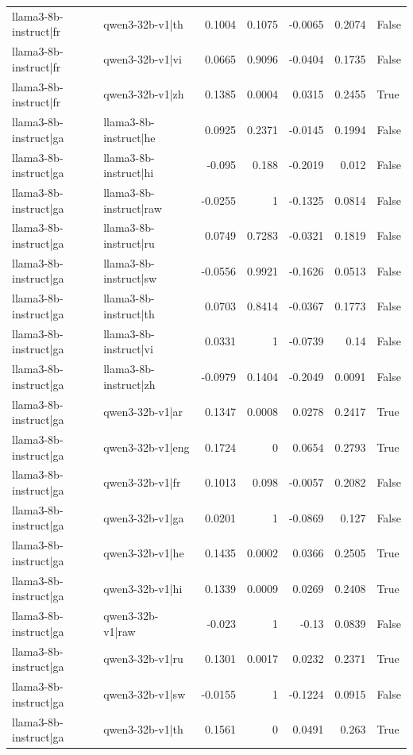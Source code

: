 \begin{table}
\begin{tabular}{l l r r r r l}
llama3-8b-instruct|fr & qwen3-32b-v1|th & 0.1004 & 0.1075 & -0.0065 & 0.2074 & False \\
llama3-8b-instruct|fr & qwen3-32b-v1|vi & 0.0665 & 0.9096 & -0.0404 & 0.1735 & False \\
llama3-8b-instruct|fr & qwen3-32b-v1|zh & 0.1385 & 0.0004 & 0.0315 & 0.2455 & True \\
llama3-8b-instruct|ga & llama3-8b-instruct|he & 0.0925 & 0.2371 & -0.0145 & 0.1994 & False \\
llama3-8b-instruct|ga & llama3-8b-instruct|hi & -0.095 & 0.188 & -0.2019 & 0.012 & False \\
llama3-8b-instruct|ga & llama3-8b-instruct|raw & -0.0255 & 1 & -0.1325 & 0.0814 & False \\
llama3-8b-instruct|ga & llama3-8b-instruct|ru & 0.0749 & 0.7283 & -0.0321 & 0.1819 & False \\
llama3-8b-instruct|ga & llama3-8b-instruct|sw & -0.0556 & 0.9921 & -0.1626 & 0.0513 & False \\
llama3-8b-instruct|ga & llama3-8b-instruct|th & 0.0703 & 0.8414 & -0.0367 & 0.1773 & False \\
llama3-8b-instruct|ga & llama3-8b-instruct|vi & 0.0331 & 1 & -0.0739 & 0.14 & False \\
llama3-8b-instruct|ga & llama3-8b-instruct|zh & -0.0979 & 0.1404 & -0.2049 & 0.0091 & False \\
llama3-8b-instruct|ga & qwen3-32b-v1|ar & 0.1347 & 0.0008 & 0.0278 & 0.2417 & True \\
llama3-8b-instruct|ga & qwen3-32b-v1|eng & 0.1724 & 0 & 0.0654 & 0.2793 & True \\
llama3-8b-instruct|ga & qwen3-32b-v1|fr & 0.1013 & 0.098 & -0.0057 & 0.2082 & False \\
llama3-8b-instruct|ga & qwen3-32b-v1|ga & 0.0201 & 1 & -0.0869 & 0.127 & False \\
llama3-8b-instruct|ga & qwen3-32b-v1|he & 0.1435 & 0.0002 & 0.0366 & 0.2505 & True \\
llama3-8b-instruct|ga & qwen3-32b-v1|hi & 0.1339 & 0.0009 & 0.0269 & 0.2408 & True \\
llama3-8b-instruct|ga & qwen3-32b-v1|raw & -0.023 & 1 & -0.13 & 0.0839 & False \\
llama3-8b-instruct|ga & qwen3-32b-v1|ru & 0.1301 & 0.0017 & 0.0232 & 0.2371 & True \\
llama3-8b-instruct|ga & qwen3-32b-v1|sw & -0.0155 & 1 & -0.1224 & 0.0915 & False \\
llama3-8b-instruct|ga & qwen3-32b-v1|th & 0.1561 & 0 & 0.0491 & 0.263 & True \\

\end{tabular}
\end{table}
